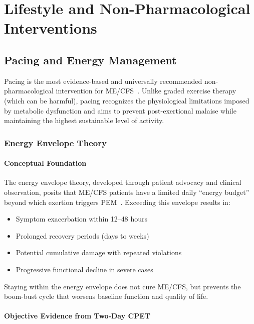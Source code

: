 \chapter{Lifestyle and Non-Pharmacological Interventions}
\label{ch:lifestyle}

\section{Pacing and Energy Management}
\label{sec:pacing}

Pacing is the most evidence-based and universally recommended non-pharmacological intervention for ME/CFS~\cite{jason2012energy, NICE2021mecfs}. Unlike graded exercise therapy (which can be harmful), pacing recognizes the physiological limitations imposed by metabolic dysfunction and aims to prevent post-exertional malaise while maintaining the highest sustainable level of activity.

\subsection{Energy Envelope Theory}

\subsubsection{Conceptual Foundation}

The energy envelope theory, developed through patient advocacy and clinical observation, posits that ME/CFS patients have a limited daily ``energy budget'' beyond which exertion triggers PEM~\cite{Jason2008EnergyEnvelope}. Exceeding this envelope results in:

\begin{itemize}
    \item Symptom exacerbation within 12--48 hours
    \item Prolonged recovery periods (days to weeks)
    \item Potential cumulative damage with repeated violations
    \item Progressive functional decline in severe cases
\end{itemize}

Staying within the energy envelope does not cure ME/CFS, but prevents the boom-bust cycle that worsens baseline function and quality of life.

\subsubsection{Objective Evidence from Two-Day CPET}

